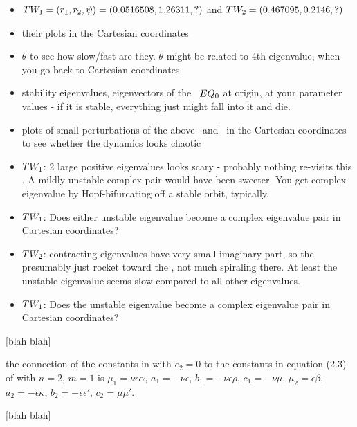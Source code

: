 \documentclass[aip,cha,reprint,
secnumarabic,
nofootinbib, tightenlines,
nobibnotes, showkeys, showpacs,
groupedaddress
]{revtex4-1}
\begin{document}
\begin{itemize}
  \item $TW_{1} = (r_1,r_2,\psi)=(0.0516508, 1.26311,?)$ and
        $TW_{2} = (0.467095,0.2146,?)$
  \item their plots in the Cartesian coordinates
  \item $\dot{\theta}$ to see how slow/fast are they. $\dot{\theta}$
        might be related to 4th eigenvalue, when you go back
        to Cartesian coordinates
  \item stability eigenvalues, eigenvectors of the \eqv\ $EQ_{0}$ at
        origin, at your parameter values - if it is stable, everything
        just might fall into it and die.
  \item plots of small perturbations of the above \eqv\ and \reqva\ in
        the Cartesian coordinates to see whether the dynamics looks
        chaotic
  \item $TW_{1}$: 2 large positive eigenvalues looks scary - probably
        nothing re-visits this \reqv. A mildly unstable complex pair
        would have been sweeter. You get complex eigenvalue by Hopf-bifurcating off a
        stable orbit, typically.
  \item $TW_{1}$: Does either unstable eigenvalue become a complex
        eigenvalue pair in Cartesian coordinates?
  \item $TW_{2}$: contracting eigenvalues have very small imaginary
        part, so the presumably just rocket toward the \reqv, not much
        spiraling there. At least the unstable eigenvalue seems slow
        compared to all other eigenvalues.
  \item $TW_{1}$: Does the unstable eigenvalue become a complex
        eigenvalue pair in Cartesian coordinates?
\end{itemize}

 [blah blah]

the connection
of the constants in  with $e_2=0$ to the constants in
equation (2.3) of  with $n=2$, $m=1$ is $\mu_1=\nu\epsilon\alpha$,
$a_1=-\nu\epsilon$, $b_1=-\nu\epsilon\rho$, $c_1=-\nu\mu$, $\mu_2=\epsilon\beta$,
$a_2=-\epsilon\kappa$, $b_2=-\epsilon\epsilon'$, $c_2=\mu\mu'$.


 [blah blah]
\end{document}
